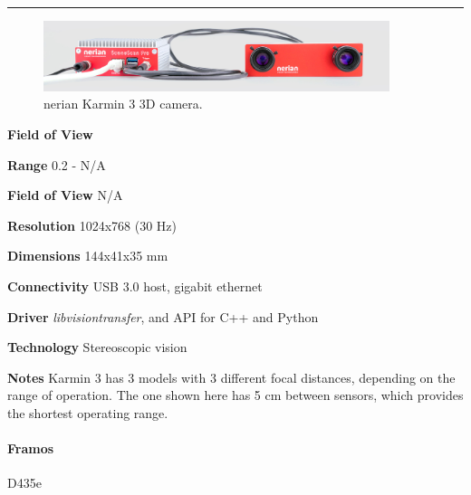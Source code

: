 \documentclass[../main.tex]{subfiles}
\begin{document}
\noindent\rule{8cm}{0.1pt}
\begin{figure}[H]
    \centering
    \includegraphics[width=0.9\textwidth]{images/karmin3.jpg}
    \caption{nerian Karmin 3 3D camera.}
    \label{fig:karmin3}
\end{figure}
\begin{labeling}{\textbf{Field of View    }}
    \setlength{\itemindent}{2em}
    \item [\textbf{Range}] 0.2 - N/A
    \item [\textbf{Field of View}] N/A
    \item [\textbf{Resolution}] 1024x768 (30 Hz)
    \item [\textbf{Dimensions}] 144x41x35 mm
    \item [\textbf{Connectivity}] USB 3.0 host, gigabit ethernet
    \item [\textbf{Driver}] \emph{libvisiontransfer}, and API for C++ and Python
    \item [\textbf{Technology}] Stereoscopic vision
    \item [\textbf{Notes}] Karmin 3 has 3 models with 3 different focal distances, depending on the range of operation. The one shown here has 5 cm between sensors, which provides the shortest operating range.
\end{labeling}
\vspace{1em}
\paragraph{\large \textbf{Framos}} {\large D435e}
\end{document}

